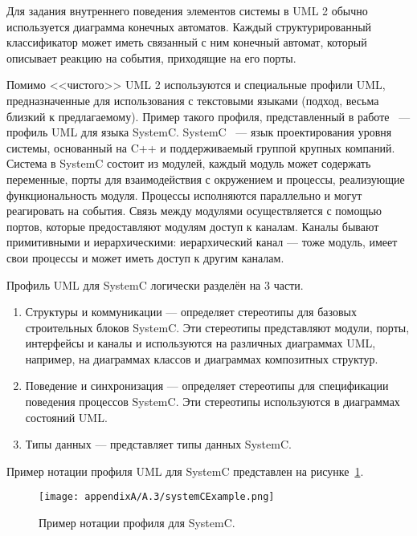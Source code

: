 Для задания внутреннего поведения элементов системы в UML 2 обычно используется диаграмма 
конечных автоматов. Каждый структурированный классификатор может иметь связанный с 
ним конечный автомат, который описывает реакцию на события, приходящие на его порты.

Помимо <<чистого>> UML 2 используются и специальные профили UML, предназначенные для 
использования с текстовыми языками (подход, весьма близкий к предлагаемому). Пример 
такого профиля, представленный в работе~\cite{riccobene2005uml} --- профиль UML для языка SystemC. 
SystemC~\cite{arnout2000systemc} --- язык проектирования уровня системы, основанный на C++ и поддерживаемый группой крупных компаний. 
Система в SystemC состоит из модулей, каждый модуль может содержать переменные, порты 
для взаимодействия с окружением и процессы, реализующие функциональность модуля. Процессы
исполняются параллельно и могут реагировать на события. Связь между модулями осуществляется 
с помощью портов, которые предоставляют модулям доступ к каналам. Каналы бывают примитивными 
и иерархическими: иерархический канал --- тоже модуль, имеет свои процессы и может иметь 
доступ к другим каналам.

Профиль UML для SystemC логически разделён на 3 части.
\begin{enumerate}
	\item Структуры и коммуникации --- определяет стереотипы для базовых строительных 
		блоков SystemC. Эти стереотипы представляют модули, порты, интерфейсы и каналы
		и используются на различных диаграммах UML, например, на диаграммах классов и 
		диаграммах композитных структур.
	\item Поведение и синхронизация --- определяет стереотипы для спецификации поведения 
		процессов SystemC. Эти стереотипы используются в диаграммах состояний UML.
	\item Типы данных --- представляет типы данных SystemC.
\end{enumerate}

Пример нотации профиля UML для SystemC представлен на рисунке~\ref{image:systemCExample}.

\begin{figure} [ht]
	\begin{center}
		\texttt{[image: appendixA/A.3/systemCExample.png]}
		\caption{Пример нотации профиля для SystemC.}
		\label{image:systemCExample}
	\end{center}
\end{figure}

